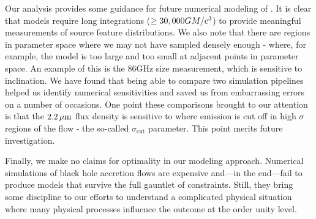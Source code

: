 Our analysis provides some guidance for future numerical modeling of \sgra.  It is clear that models require long integrations ($\ge 30,000 GM/c^3$) to provide meaningful measurements of source feature distributions.  We also note that there are regions in parameter space where we may not have sampled densely enough - where, for example, the model is too large and too small at adjacent points in parameter space.  An example of this is the 86GHz size measurement, which is sensitive to inclination.  We have found that being able to compare two simulation pipelines helped us identify numerical sensitivities and saved us from embarrassing errors on a number of occasions.  One point these comparisons brought to our attention is that the $2.2\,\mu\mathrm{m}$ flux density is sensitive to where emission is cut off in high $\sigma$ regions of the flow - the so-called $\sigma_\mathrm{cut}$ parameter.  This point merits future investigation.

Finally, we make no claims for optimality in our modeling approach.  Numerical simulations of black hole accretion flows are expensive and---in the end---fail to produce models that survive the full gauntlet of constraints.  Still, they bring some discipline to our efforts to understand a complicated physical situation where many physical processes influence the outcome at the order unity level.







